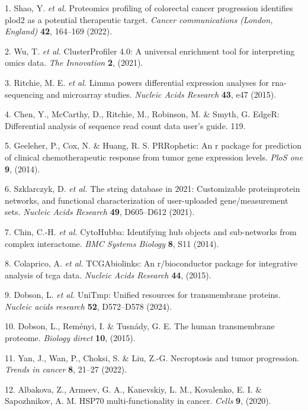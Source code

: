 \documentclass[
]{article}
\newenvironment{cslreferences}%
  {}%
  {\par}
\begin{document}
\hypertarget{refs}{}
\begin{cslreferences}
\leavevmode\hypertarget{ref-ProteomicsProfShao2022}{}%
1. Shao, Y. \emph{et al.} Proteomics profiling of colorectal cancer progression identifies plod2 as a potential therapeutic target. \emph{Cancer communications (London, England)} \textbf{42}, 164--169 (2022).

\leavevmode\hypertarget{ref-ClusterprofilerWuTi2021}{}%
2. Wu, T. \emph{et al.} ClusterProfiler 4.0: A universal enrichment tool for interpreting omics data. \emph{The Innovation} \textbf{2}, (2021).

\leavevmode\hypertarget{ref-LimmaPowersDiRitchi2015}{}%
3. Ritchie, M. E. \emph{et al.} Limma powers differential expression analyses for rna-sequencing and microarray studies. \emph{Nucleic Acids Research} \textbf{43}, e47 (2015).

\leavevmode\hypertarget{ref-EdgerDifferenChen}{}%
4. Chen, Y., McCarthy, D., Ritchie, M., Robinson, M. \& Smyth, G. EdgeR: Differential analysis of sequence read count data user's guide. 119.

\leavevmode\hypertarget{ref-PrropheticAnGeeleh2014}{}%
5. Geeleher, P., Cox, N. \& Huang, R. S. PRRophetic: An r package for prediction of clinical chemotherapeutic response from tumor gene expression levels. \emph{PloS one} \textbf{9}, (2014).

\leavevmode\hypertarget{ref-TheStringDataSzklar2021}{}%
6. Szklarczyk, D. \emph{et al.} The string database in 2021: Customizable proteinprotein networks, and functional characterization of user-uploaded gene/measurement sets. \emph{Nucleic Acids Research} \textbf{49}, D605--D612 (2021).

\leavevmode\hypertarget{ref-CytohubbaIdenChin2014}{}%
7. Chin, C.-H. \emph{et al.} CytoHubba: Identifying hub objects and sub-networks from complex interactome. \emph{BMC Systems Biology} \textbf{8}, S11 (2014).

\leavevmode\hypertarget{ref-TcgabiolinksAColapr2015}{}%
8. Colaprico, A. \emph{et al.} TCGAbiolinks: An r/bioconductor package for integrative analysis of tcga data. \emph{Nucleic Acids Research} \textbf{44}, (2015).

\leavevmode\hypertarget{ref-UnitmpUnifiedDobson2024}{}%
9. Dobson, L. \emph{et al.} UniTmp: Unified resources for transmembrane proteins. \emph{Nucleic acids research} \textbf{52}, D572--D578 (2024).

\leavevmode\hypertarget{ref-TheHumanTransDobson2015}{}%
10. Dobson, L., Reményi, I. \& Tusnády, G. E. The human transmembrane proteome. \emph{Biology direct} \textbf{10}, (2015).

\leavevmode\hypertarget{ref-NecroptosisAndYanJ2022}{}%
11. Yan, J., Wan, P., Choksi, S. \& Liu, Z.-G. Necroptosis and tumor progression. \emph{Trends in cancer} \textbf{8}, 21--27 (2022).

\leavevmode\hypertarget{ref-Hsp70MultiFunAlbako2020}{}%
12. Albakova, Z., Armeev, G. A., Kanevskiy, L. M., Kovalenko, E. I. \& Sapozhnikov, A. M. HSP70 multi-functionality in cancer. \emph{Cells} \textbf{9}, (2020).
\end{cslreferences}
\end{document}

